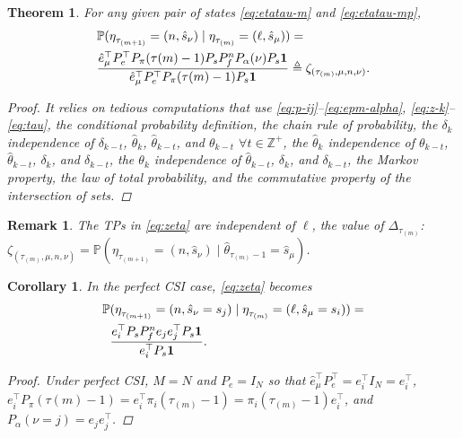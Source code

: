 \documentclass[letterpaper, 10 pt, conference]{ieeeconf}  %
\newtheorem{theorem}{Theorem}
\newtheorem{corollary}{Corollary}[theorem]
\newtheorem{remark}{Remark}
\begin{document}
\begin{theorem}\label{theorem:eta-probability}
    For any given pair of states \eqref{eq:etatau-m} and \eqref{eq:etatau-mp}, 
    \begin{align}\label{eq:zeta}
    \begin{aligned}
        &\text{\small $\mathbb{P}(\eta_{\tau_{(m+1)}}^{} = (n,\hat{s}_{\nu}) \mid \eta_{\tau_{(m)}}^{} = (\ell,\hat{s}_{\mu})) =$} \\
        & \text{\small $\frac{\hat{e}_{\mu}^{\top} P_{e}^{\top} P_{\pi}(\tau{(m)}-1) P_{s} P_{f}^{n} P_{\alpha}(\nu) P_{s} \mathbf{1}}{\hat{e}_{\mu}^{\top} P_{e}^{\top} P_{\pi}(\tau{(m)}-1) P_{s}\mathbf{1}} \triangleq \zeta_{(\tau_{(m)},\mu,n,\nu)}$}.
    \end{aligned}        
    \end{align}
\begin{proof}
    It relies on tedious computations that use \eqref{eq:p-ij}--\eqref{eq:epm-alpha}, \eqref{eq:z-k}--\eqref{eq:tau}, the conditional probability definition, the chain rule of probability, the $\delta_{k}$ independence of $\delta_{k-t}$, $\hat{\theta}_{k}$, $\hat{\theta}_{k-t}$, and $\theta_{k-t}$ $\forall t \in \mathbb{Z}^{+}$, the $\hat{\theta}_{k}$ independence of $\theta_{k-t}$, $\hat{\theta}_{k-t}$, $\delta_k$, and $\delta_{k-t}$,
    the $\theta_{k}$ independence of $\hat{\theta}_{k-t}$, $\delta_{k}$, and $\delta_{k-t}$,
    the Markov property, the law of total probability, 
    and the commutative property of the intersection of sets.
\end{proof}
\end{theorem}
\begin{remark}\label{rem:zeta-l-independence}
The TPs in \eqref{eq:zeta} are independent of $\ell$, the value of {\small $\mathit{\Delta}_{\tau_{(m)}}$: $\zeta_{(\tau_{(m)},\mu,n,\nu)} = \mathbb{P}(\eta_{\tau_{(m+1)}}^{} \!= (n,\hat{s}_{\nu}) \mid \hat{\theta}_{\tau_{(m)}-1} \!= \hat{s}_{\mu})$}.
\end{remark}
\begin{corollary}\label{corollary:eta}
In the \emph{perfect CSI} case, \eqref{eq:zeta} becomes
\begin{align}\label{eq:zeta-perfect-csi}
    \begin{aligned}
        \text{\small $\mathbb{P}$}&\text{\small $(\eta_{\tau_{(m+1)}}^{} = (n,\hat{s}_{\nu}=s_j) \mid \eta_{\tau_{(m)}}^{} = (\ell,\hat{s}_{\mu}=s_i)) =$} \\
        &\text{\small $\frac{e_{i}^{\top} P_{s} P_{f}^{n} e_{j}e_{j}^{\top} P_{s} \mathbf{1}}{e_{i}^{\top} P_{s}\mathbf{1}}$}.
    \end{aligned}
\end{align}
\begin{proof}
    Under perfect CSI, $M=N$ and $P_e = I_{N}$ so that $\hat{e}_{\mu}^{\top} P_{e}^{\top} = e_{i}^{\top} I_{N} = e_{i}^{\top}$, $e_{i}^{\top} P_{\pi}(\tau{(m)}-1)=e_{i}^{\top}\pi_{i}(\tau_{(m)}-1)=\pi_{i}(\tau_{(m)}-1)e_{i}^{\top}$, and $P_{\alpha}(\nu=j)=e_{j}e_{j}^{\top}$.
\end{proof}
\end{corollary}
\end{document}
